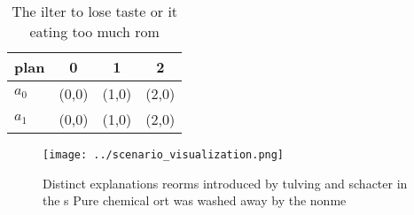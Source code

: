 \documentclass[a4paper]{article}
\begin{document}
\begin{table}
\begin{adjustbox}{width=0.6\columnwidth}
\begin{tabular}{|l|l|l|l|}
\hline
\textbf{plan} & \multicolumn{1}{c|}{\textbf{0}} & \multicolumn{1}{c|}{\textbf{1}} & \multicolumn{1}{c|}{\textbf{2}} \\ \hline
\textbf{$a_0$}  & (0,0) & (1,0) & (2,0) \\ \hline
\textbf{$a_1$}  & (0,0) & (1,0) & (2,0) \\ \hline
\end{tabular}
\end{adjustbox}
\caption{The ilter to lose taste or it eating too much rom
}
\end{table}

\begin{figure}
\centering
\texttt{[image: ../scenario\_visualization.png]}
\caption{Distinct explanations reorms introduced by tulving and schacter in the s Pure chemical ort was washed away by the nonme
}
\end{figure}
 
\end{document}
